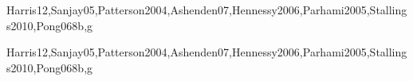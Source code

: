 \begin{syllabus}
\begin{unit}{\ARAssemblylevelmachineorganization}{}{Harris12,Sanjay05,Patterson2004,Ashenden07,Hennessy2006,Parhami2005,Stallings2010,Pong06}{8}{b,g}
\begin{learningoutcomes}
  \item \ARAssemblylevelmachineorganizationLOExplainTheTheNeumann [\Familiarity]
  \item \ARAssemblylevelmachineorganizationLODescribeHowIs [\Familiarity]
  \item \ARAssemblylevelmachineorganizationLODescribeInstruction [\Familiarity]
  \item \ARAssemblylevelmachineorganizationLOSummarize [\Familiarity]
  \item \ARAssemblylevelmachineorganizationLODemonstrateHow [\Usage]
  \item \ARAssemblylevelmachineorganizationLOExplainDifferent [\Usage]
  \item \ARAssemblylevelmachineorganizationLOExplainHowAre [\Usage]
  \item \ARAssemblylevelmachineorganizationLOExplainTheOf [\Familiarity]
  \item \ARAssemblylevelmachineorganizationLOWriteSimple [\Usage]
  \item \ARAssemblylevelmachineorganizationLOShow  [\Usage]
\end{learningoutcomes}
\end{unit}

\begin{unit}{\ARFunctionalorganization}{}{Harris12,Sanjay05,Patterson2004,Ashenden07,Hennessy2006,Parhami2005,Stallings2010,Pong06}{8}{b,g}
\begin{topics}
      \item \ARFunctionalorganizationTopicImplementation
      \item \ARFunctionalorganizationTopicControl
      \item \ARFunctionalorganizationTopicInstruction
      \item \ARFunctionalorganizationTopicIntroductionTo
\end{topics}

\begin{learningoutcomes}
\item \ARFunctionalorganizationLOCompareAlternative [\Assessment]
\item \ARFunctionalorganizationLODiscussTheControl [\Familiarity]
\item \ARFunctionalorganizationLOExplainBasic [\Usage]
\item \ARFunctionalorganizationLODesignAnd [\Usage]
\item \ARFunctionalorganizationLODetermineFor [\Assessment]
\end{learningoutcomes}
\end{unit}


\end{syllabus}
